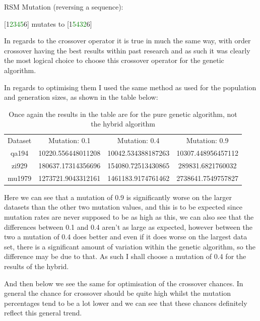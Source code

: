 \documentclass[11pt,a4paper,titlepage]{article}
\begin{document}
RSM Mutation (reversing a sequence):

\begin{center}\Large
[1\textcolor{green}{2345}6] mutates to [1\textcolor{green}{5432}6]
\end{center}

In regards to the crossover operator it is true in much the same way, with order crossover having the best results within past research \cite{GACrossoverPerformance} and as such it was clearly the most logical choice to choose this crossover operator for the genetic algorithm. 

In regards to optimising them I used the same method as used for the population and generation sizes, as shown in the table below:

\begin{table}[h]
\centering
\begin{tabular}{c | c | c | c}
Dataset & Mutation: 0.1 & Mutation: 0.4 & Mutation: 0.9 \\ [0.5ex]
\Xhline{1.5pt}
	qa194 & 10220.556448011208 & 10042.534388187263 & 10307.448956457112 \\
\hline
	zi929 & 180637.17314356696 & 154080.72513430865 & 289831.6821760032 \\
\hline
	mu1979 & 1273721.9043312161 & 1461183.9174761462 & 2738641.7549757827

\end{tabular}
\caption{Once again the results in the table are for the pure genetic algorithm, not the hybrid algorithm}
\end{table}

Here we can see that a mutation of 0.9 is significantly worse on the larger datasets than the other two mutation values, and this is to be expected since mutation rates are never supposed to be as high as this, we can also see that the differences between 0.1 and 0.4 aren't as large as expected, however between the two a mutation of 0.4 does better and even if it does worse on the largest data set, there is a significant amount of variation within the genetic algorithm, so the difference may be due to that. As such I shall choose a mutation of 0.4 for the results of the hybrid.

And then below we see the same for optimisation of the crossover chances. In general the chance for crossover should be quite high whilst the mutation percentages tend to be a lot lower and we can see that these chances definitely reflect this general trend.
\end{document}
